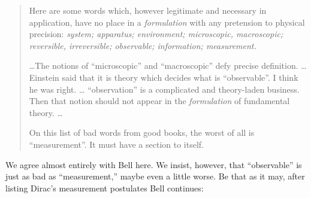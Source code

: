 \documentclass[12pt]{article}
\begin{document}
\begin{quotation}\setlength{\baselineskip}{12pt}\noindent
   Here are some words which, however legitimate and necessary in
   application, have no place in a {\it formulation\/} with any
   pretension to physical precision: {\it system; apparatus;
     environment; microscopic, macroscopic; reversible, irreversible;
     observable; information; measurement.\/}

   \dots The notions of ``microscopic'' and ``macroscopic'' defy
   precise definition. \dots Einstein said that it is theory which
   decides what is ``observable''.  I think he was right. \dots
   ``observation'' is a complicated and theory-laden business.  Then
   that notion should not appear in the {\it formulation\/} of
   fundamental theory. \dots

   On this list of bad words {}from good books, the worst of all is
   ``measurement''.  It must have a section to itself.~\cite{Bel90}
\end{quotation}

We agree almost entirely with Bell here.  We insist, however, that
``observable'' is just as bad as ``measurement,'' maybe even a little
worse.  Be that as it may, after listing Dirac's measurement
postulates Bell continues:
\end{document}
